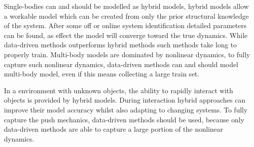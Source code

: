Single-bodies can and should be modelled as hybrid models, hybrid models allow a workable model which can be created from only the prior structural knowledge of the system. After some off or online system identification detailed parameters can be found, as effect the model will converge toward the true dynamics. While data-driven methods outperforms hybrid methods such methods take long to properly train. Multi-body models are dominated by nonlinear dynamics, to fully capture such nonlinear dynamics, data-driven methods can and should model multi-body model, even if this means collecting a large train set. 

In a environment with unknown objects, the ability to rapidly interact with objects is provided by hybrid models. During interaction hybrid approaches can improve their model accuracy whilst also adapting to changing systems. To fully capture the push mechanics, data-driven methods should be used, because only data-driven methods are able to capture a large portion of the nonlinear dynamics.
